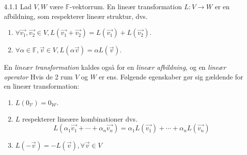 \begin{definition}{4.1.1}
	Lad $V, W$ være $\mathbb{F}$-vektorrum.
	En lineær transformation $L: V \rightarrow W$ er en afbildning, som 
	respekterer lineær struktur, dvs.
	\begin{enumerate}
		\item $\forall \vec{v_1}, \vec{v_2} \in V, L(\vec{v_1} + \vec{v_2}) = 
			L(\vec{v_1}) + L(\vec{v_2})$.
		\item $\forall \alpha \in \mathbb{F}, \vec{v} \in V, L(\alpha\vec{v}) =
			\alpha L(\vec{v})$.
	\end{enumerate}
	En \textit{lineær transformation} kaldes også for en \textit{lineær
	afbildning}, og en \textit{lineær operator} Hvis de 2 rum $V$ og $W$ er
	ens.
	Følgende egenskaber gør sig gældende for en lineær transformation:
	\begin{enumerate}
		\item $L(0_{\mathcal{V}}) = 0_{\mathcal{W}}$.
		\item $L$ respekterer lineære kombinationer dvs.
			\[
				L(\alpha_1\vec{v_1} + \cdots + \alpha_n\vec{v_n}) = 
				\alpha_1L(\vec{v_1}) + \cdots + \alpha_nL(\vec{v_n})
			\]
		\item $L(-\vec{v}) = -L(\vec{v}), \forall \vec{v} \in V$
	\end{enumerate}
\end{definition}
